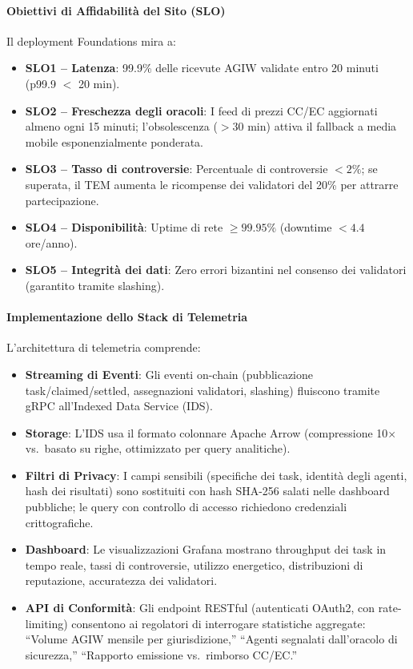 \documentclass[11pt]{article}
\begin{document}
\paragraph{Obiettivi di Affidabilità del Sito (SLO)} Il deployment Foundations mira a:
\begin{itemize}[noitemsep]
  \item \textbf{SLO1 -- Latenza}: 99.9\% delle ricevute AGIW validate entro 20 minuti (p99.9 $<$ 20 min).
  \item \textbf{SLO2 -- Freschezza degli oracoli}: I feed di prezzi CC/EC aggiornati almeno ogni 15 minuti; l'obsolescenza ($>30$ min) attiva il fallback a media mobile esponenzialmente ponderata.
  \item \textbf{SLO3 -- Tasso di controversie}: Percentuale di controversie $<2\%$; se superata, il TEM aumenta le ricompense dei validatori del 20\% per attrarre partecipazione.
  \item \textbf{SLO4 -- Disponibilità}: Uptime di rete $\geq 99.95\%$ (downtime $<4.4$ ore/anno).
  \item \textbf{SLO5 -- Integrità dei dati}: Zero errori bizantini nel consenso dei validatori (garantito tramite slashing).
\end{itemize}

\paragraph{Implementazione dello Stack di Telemetria} L'architettura di telemetria comprende:
\begin{itemize}[noitemsep]
  \item \textbf{Streaming di Eventi}: Gli eventi on-chain (pubblicazione task/claimed/settled, assegnazioni validatori, slashing) fluiscono tramite gRPC all'Indexed Data Service (IDS).
  \item \textbf{Storage}: L'IDS usa il formato colonnare Apache Arrow (compressione 10$\times$ vs.\ basato su righe, ottimizzato per query analitiche).
  \item \textbf{Filtri di Privacy}: I campi sensibili (specifiche dei task, identità degli agenti, hash dei risultati) sono sostituiti con hash SHA-256 salati nelle dashboard pubbliche; le query con controllo di accesso richiedono credenziali crittografiche.
  \item \textbf{Dashboard}: Le visualizzazioni Grafana mostrano throughput dei task in tempo reale, tassi di controversie, utilizzo energetico, distribuzioni di reputazione, accuratezza dei validatori.
  \item \textbf{API di Conformità}: Gli endpoint RESTful (autenticati OAuth2, con rate-limiting) consentono ai regolatori di interrogare statistiche aggregate: ``Volume AGIW mensile per giurisdizione,'' ``Agenti segnalati dall'oracolo di sicurezza,'' ``Rapporto emissione vs.\ rimborso CC/EC.''
\end{itemize}
\end{document}
